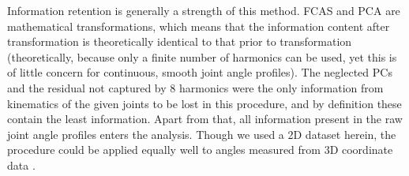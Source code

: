 \bigskip
Information retention is generally a strength of this method.
FCAS and PCA are mathematical transformations, which means that the information content after transformation is theoretically identical to that prior to transformation (theoretically, because only a finite number of harmonics can be used, yet this is of little concern for continuous, smooth joint angle profiles).
The neglected PCs and the residual not captured by 8 harmonics were the only information from kinematics of the given joints to be lost in this procedure, and by definition these contain the least information.
Apart from that, all information present in the raw joint angle profiles enters the analysis.
Though we used a 2D dataset herein, the procedure could be applied equally well to angles measured from 3D coordinate data \citep{Scott2022}.



